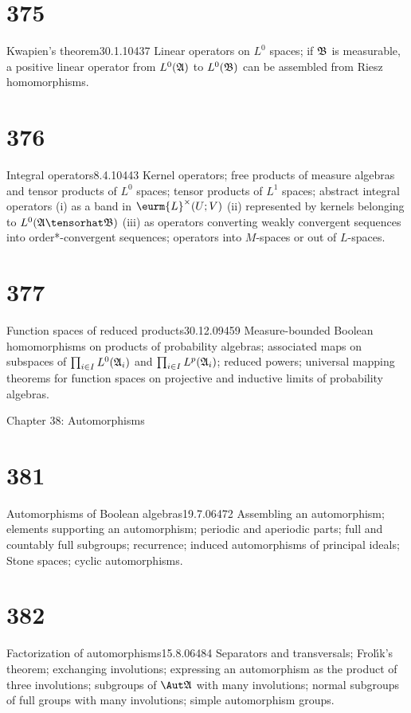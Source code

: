 \section{375}{Kwapien's theorem}{30.1.10}{437}{}
{Linear operators on $L^0$ spaces;  if $\frak{B}$ is measurable, a
positive linear operator from $L^0(\frak{A})$ to $L^0(\frak{B})$ can be
assembled from Riesz homomorphisms.}
     
\section{376}{Integral operators}{8.4.10}{443}{}
{Kernel operators;  free products of measure algebras and tensor
products of $L^0$ spaces;  tensor products of $L^1$ spaces;  abstract
integral operators (i) as a band in $\eurm{L}^{\times}(U;V)$ (ii)
represented by kernels belonging to $L^0(\frak{A}\tensorhat\frak{B})$
(iii) as operators converting weakly convergent sequences into
order*-convergent sequences;  operators into $M$-spaces or
out of $L$-spaces.}
     
\section{377}{Function spaces of reduced products}{30.12.09}{459}{}
{Measure-bounded Boolean homomorphisms on products of probability algebras;
associated maps on subspaces of $\prod_{i\in{I}}L^0(\frak{A}_i)$ and     
$\prod_{i\in{I}}L^p(\frak{A}_i)$;  reduced powers;
universal mapping theorems for
function spaces on projective and inductive limits of probability
algebras.}

     
 Chapter 38:  Automorphisms
     
     
\section{381}{Automorphisms of Boolean algebras}{19.7.06}{472}{}
{Assembling an automorphism;  elements supporting
an automorphism;  periodic and aperiodic parts;  
full and countably full subgroups;  recurrence;  
induced automorphisms of principal ideals;  Stone spaces;  
cyclic automorphisms.}

\section{382}{Factorization of automorphisms}{15.8.06}{484}{}
{Separators and transversals;  Frol\'{\i}k's theorem;  
exchanging involutions;  expressing an automorphism as the product of 
three involutions;  
subgroups of $\Aut\frak{A}$ with many involutions;  normal
subgroups of full groups with many involutions;  simple 
automorphism groups.}
     
